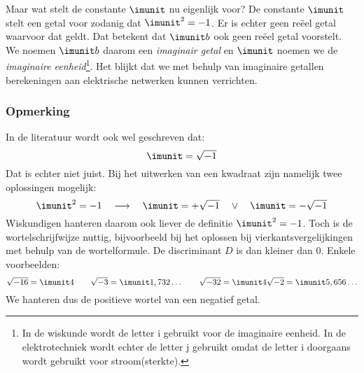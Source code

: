 
Maar wat stelt de constante $\imunit$ nu eigenlijk voor? De constante $\imunit$ stelt een getal voor zodanig dat $\imunit^2 = -1$. Er is echter geen reëel getal waarvoor dat geldt. Dat betekent dat $\imunit b$ ook geen reëel getal voorstelt. We noemen $\imunit b$ daarom een \textsl{imaginair getal} en $\imunit$ noemen we de \textsl{imaginaire eenheid}\footnote{In de wiskunde wordt de letter i gebruikt voor de imaginaire eenheid. In de elektrotechniek wordt echter de letter j gebruikt omdat de letter i doorgaans wordt gebruikt voor stroom(sterkte).}. Het blijkt dat we met behulp van imaginaire getallen berekeningen aan elektrische netwerken kunnen verrichten.

\subsubsection*{Opmerking}
In de literatuur wordt ook wel geschreven dat:
%
\begin{equation}
\imunit = \sqrt{-1}
\end{equation}
%
Dat is echter niet juist. Bij het uitwerken van een kwadraat zijn namelijk twee oplossingen mogelijk:
%
\begin{equation}
\imunit^2 = -1 \quad \longrightarrow \quad \imunit = +\sqrt{-1} \quad\vee\quad \imunit = -\sqrt{-1}
\end{equation}
%
Wiskundigen hanteren daarom ook liever de definitie $\imunit^2=-1$. Toch is de wortelschrijfwijze nuttig, bijvoorbeeld bij het oplossen bij vierkantsvergelijkingen met behulp van de wortelformule. De discriminant $D$ is dan kleiner dan 0. Enkele voorbeelden:
%
\begin{equation}
\sqrt{-16} = \imunit 4 \qquad \sqrt{-3} = \imunit 1,732\ldots \qquad \sqrt{-32} = \imunit4\sqrt{-2} = \imunit5,656\ldots
\end{equation}
%
We hanteren dus de positieve wortel van een negatief getal.

%

